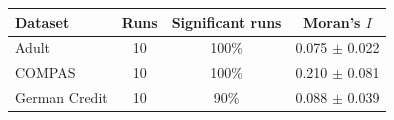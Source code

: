 \begin{tabular}{lccc}
\hline
Dataset & Runs & Significant runs & Moran's $I$ \\
\hline
Adult & 10 & 100\% & 0.075 $\pm$ 0.022 \\
COMPAS & 10 & 100\% & 0.210 $\pm$ 0.081 \\
German Credit & 10 & 90\% & 0.088 $\pm$ 0.039 \\
\hline
\end{tabular}